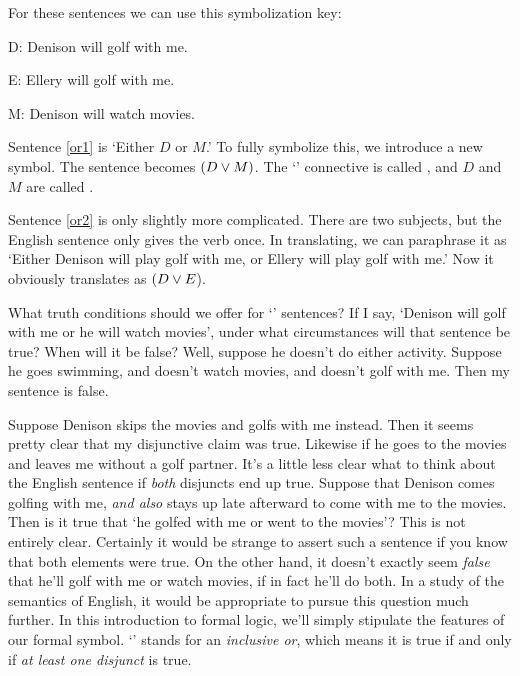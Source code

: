 For these sentences we can use this symbolization key:

\begin{ekey}
\item[D:] Denison will golf with me.
\item[E:] Ellery will golf with me.
\item[M:] Denison will watch movies.
\end{ekey}

Sentence \ref{or1} is `Either $D$ or $M$.' To fully symbolize this, we introduce a new symbol. The sentence becomes $(D \vee M)$. The `\eor' connective is called , and $D$ and $M$ are called .

Sentence \ref{or2} is only slightly more complicated. There are two subjects, but the English sentence only gives the verb once. In translating, we can paraphrase it as `Either Denison will play golf with me, or Ellery will play golf with me.' Now it obviously translates as $(D \vee E$).


What truth conditions should we offer for `\eor' sentences? If I say, `Denison will golf with me or he will watch movies', under what circumstances will that sentence be true? When will it be false? Well, suppose he doesn't do either activity. Suppose he goes swimming, and doesn't watch movies, and doesn't golf with me. Then my sentence is false.

Suppose Denison skips the movies and golfs with me instead. Then it seems pretty clear that my disjunctive claim was true. Likewise if he goes to the movies and leaves me without a golf partner. It's a little less clear what to think about the English sentence if \emph{both} disjuncts end up true. Suppose that Denison comes golfing with me, \emph{and also} stays up late afterward to come with me to the movies. Then is it true that `he golfed with me or went to the movies'? This is not entirely clear. Certainly it would be strange to assert such a sentence if you know that both elements were true. On the other hand, it doesn't exactly seem \emph{false} that he'll golf with me or watch movies, if in fact he'll do both. In a study of the semantics of English, it would be appropriate to pursue this question much further. In this introduction to formal logic, we'll simply stipulate the features of our formal symbol. `\eor' stands for an \emph{inclusive or}, which means it is true if and only if \emph{at least one disjunct} is true.

